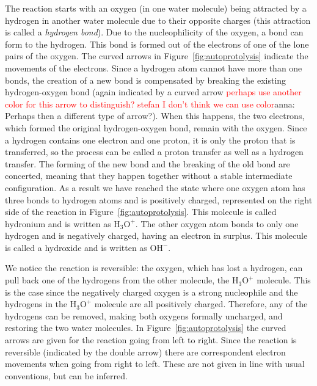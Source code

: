 \documentclass[runningheads]{llncs}
\newcommand\anna[1]{\textcolor{red}{#1}}
\begin{document}
The reaction
starts with an oxygen (in one water molecule) being attracted by a hydrogen in another 
water molecule due to their opposite
charges (this attraction is called a \emph{hydrogen bond}). Due to the nucleophilicity of 
the oxygen, a bond can form to the hydrogen. This bond is formed out of 
the electrons of one of the lone pairs of the oxygen. The curved arrows in Figure~\ref{fig:autoprotolysis} indicate the movements of the electrons. Since a hydrogen atom cannot have more 
than one bonds, 
the creation of a new bond is compensated by breaking the existing hydrogen-oxygen bond (again indicated by a curved arrow
\anna{perhaps use another color for this arrow to distinguish? stefan I don't think we can use color}anna: Perhaps then a different type of arrow?). When this happens, the two electrons, which formed the original hydrogen-oxygen bond, remain with the oxygen. Since a hydrogen contains %
one electron and one proton, it is only the proton that is transferred, so the process can be called a proton transfer as well as a hydrogen transfer. The forming of the new bond and the breaking of the old bond are concerted, meaning that %
they happen together without a stable 
intermediate configuration. As a result we have reached the state where one oxygen atom
has three bonds to hydrogen atoms and is positively charged, represented on the right side of the reaction in %
 Figure~\ref{fig:autoprotolysis}. This molecule is called hydronium and is written as $\mathrm{H_3O^+}$. The other oxygen atom bonds to only one hydrogen and is negatively charged, having an 
electron in surplus. This molecule is called a hydroxide and is written as $\mathrm{OH^-}$. 

We notice the reaction is reversible: the oxygen, which has lost a hydrogen, can 
pull back one of the hydrogens from the other molecule, the  $\mathrm{H_3O^+}$ molecule. This is the case since the negatively 
charged oxygen is a strong nucleophile and the hydrogens in the $\mathrm{H_3O^+}$ molecule are 
all positively charged. Therefore, any of the hydrogens 
can be removed, making both oxygens formally uncharged, and restoring the two water 
molecules. In Figure~\ref{fig:autoprotolysis} the curved arrows are given for the reaction going from left to right. Since the reaction is reversible (indicated by the double arrow) there are correspondent electron movements when going from right to left. These are not given in line with usual conventions, but can be inferred.
\end{document}
